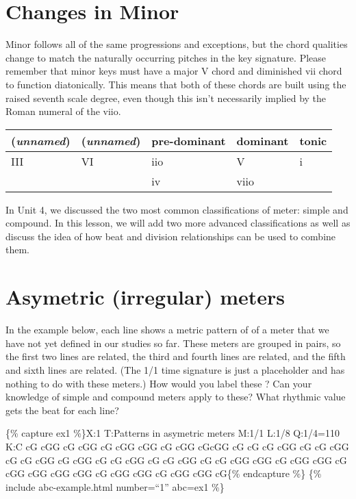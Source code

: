 \documentclass{book}
\begin{document}
\hypertarget{changes-in-minor}{%
\section{Changes in Minor}\label{changes-in-minor}}

Minor follows all of the same progressions and exceptions, but the chord
qualities change to match the naturally occurring pitches in the key
signature. Please remember that minor keys must have a major V chord and
diminished vii chord to function diatonically. This means that both of these
chords are built using the raised seventh scale degree, even though this isn't
necessarily implied by the Roman numeral of the viio.

\begin{longtable}[]{@{}lllll@{}}
\toprule
(\emph{unnamed}) & (\emph{unnamed}) & pre-dominant & dominant & tonic \\
\midrule
\endhead
III & VI & iio & V & i \\
& & iv & viio & \\
\bottomrule
\end{longtable}

In Unit 4, we discussed the two most common classifications of meter: simple
and compound. In this lesson, we will add two more advanced classifications as
well as discuss the idea of how beat and division relationships can be used to
combine them.

\hypertarget{asymetric-irregular-meters}{%
\section{Asymetric (irregular) meters}\label{asymetric-irregular-meters}}

In the example below, each line shows a metric pattern of of a meter that we
have not yet defined in our studies so far. These meters are grouped in pairs,
so the first two lines are related, the third and fourth lines are related,
and the fifth and sixth lines are related. (The 1/1 time signature is just a
placeholder and has nothing to do with these meters.) How would you label
these ? Can your knowledge of simple and compound meters apply to these? What
rhythmic value gets the beat for each line?

\{\% capture ex1 \%\}X:1 T:Patterns in asymetric meters M:1/1 L:1/8 Q:1/4=110
K:C cG cGG\textbar{} cG cGG\textbar{} cG cGG\textbar{]} cGG cG\textbar{} cGG
cG\textbar cGG cG\textbar{]} cG cG cGG\textbar{} cG cG cGG\textbar{} cG cG
cGG\textbar{]} cG cGG cG\textbar{} cG cGG cG\textbar{} cG cGG cG\textbar{]} cG
cGG cGG\textbar{} cG cGG cGG\textbar{} cG cGG cGG\textbar{]} cGG cGG
cG\textbar{} cGG cGG cG\textbar{} cGG cGG cG\textbar{]}\{\% endcapture \%\}
\{\% include abc-example.html number=``1'' abc=ex1 \%\}
\end{document}
